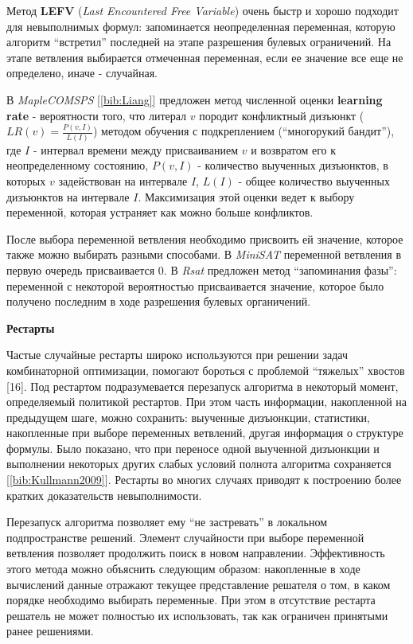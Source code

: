 Метод \textbf{LEFV} (\textit{Last Encountered Free Variable}) очень быстр и хорошо подходит для невыполнимых формул: запоминается неопределенная переменная, которую алгоритм \enquote{встретил} последней на этапе разрешения булевых ограничений. На этапе ветвления выбирается отмеченная переменная, если ее значение все еще не определено, иначе - случайная.

В \textit{MapleCOMSPS} [\ref{bib:Liang}] предложен метод численной оценки \textbf{learning rate} - вероятности того, 
что литерал $v$ породит конфликтный дизъюнкт ($LR(v) = \frac{P(v,I)}{L(I)}$) 
методом обучения с подкреплением (\enquote{многорукий бандит}), где 
$I$ - интервал времени между присваиванием $v$ и возвратом его к неопределенному состоянию, 
$P(v,I)$ - количество выученных дизъюнктов, в которых $v$ задействован на интервале $I$,
$L(I)$ - общее количество выученных дизъюнктов на интервале $I$. Максимизация этой оценки ведет к выбору переменной, которая устраняет как можно больше конфликтов.

После выбора переменной ветвления необходимо присвоить ей значение, которое также можно выбирать разными способами. В \textit{MiniSAT} переменной ветвления в первую очередь присваивается $0$. В \textit{Rsat} предложен метод \enquote{запоминания фазы}: переменной с некоторой вероятностью присваивается значение, которое было получено последним в ходе разрешения булевых органичений.

\textbf{Рестарты}

Частые случайные рестарты широко используются при решении задач комбинаторной оптимизации, помогают бороться с проблемой \enquote{тяжелых} хвостов [16]. Под рестартом подразумевается перезапуск алгоритма в некоторый момент, определяемый политикой рестартов. При этом часть информации, накопленной на предыдущем шаге, можно сохранить: выученные дизъюнкции, статистики, накопленные при выборе переменных ветвлений, другая информация о структуре формулы. Было показано, что при переносе одной выученной дизъюнкции и выполнении некоторых других слабых условий полнота алгоритма сохраняется [\ref{bib:Kullmann2009}]. Рестарты во многих случаях приводят к построению более кратких доказательств невыполнимости.

Перезапуск алгоритма позволяет ему \enquote{не застревать} в локальном подпространстве решений. Элемент случайности при выборе переменной ветвления позволяет продолжить поиск в новом направлении. Эффективность этого метода можно объяснить следующим образом: накопленные в ходе вычислений данные отражают текущее представление решателя о том, в каком порядке необходимо выбирать переменные. При этом в отсутствие рестарта решатель не может полностью их использовать, так как ограничен принятыми ранее решениями.


